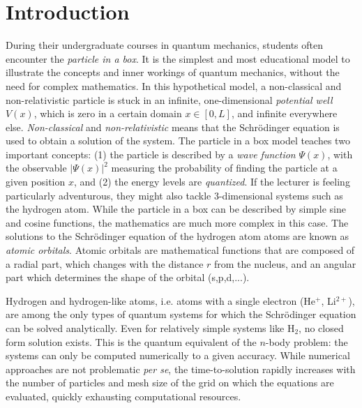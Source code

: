 \chapter*{Introduction}

During their undergraduate courses in quantum mechanics, students often encounter the \emph{particle in a box}. It is the simplest and most educational model to illustrate the concepts and inner workings of quantum mechanics, without the need for complex mathematics. In this hypothetical model, a non-classical and non-relativistic particle is stuck in an infinite, one-dimensional \emph{potential well} $V(x)$, which is zero in a certain domain $x \in [0,L]$, and infinite everywhere else. \emph{Non-classical} and \emph{non-relativistic} means that the Schrödinger equation is used to obtain a solution of the system. The particle in a box model teaches two important concepts: (1) the particle is described by a \emph{wave function}  $\Psi(x)$, with the observable $\left\lvert \Psi (x) \right\rvert^2$ measuring the probability of finding the particle at a given position $x$, and (2) the energy levels are \emph{quantized}. If the lecturer is feeling particularly adventurous, they might also tackle 3-dimensional systems such as the hydrogen atom. While the particle in a box can be described by simple sine and cosine functions, the mathematics are much more complex in this case. The solutions to the Schrödinger equation of the hydrogen atom atoms are known as \emph{atomic orbitals}. Atomic orbitals are mathematical functions that are composed of a radial part, which changes with the distance $r$ from the nucleus, and an angular part which determines the shape of the orbital (s,p,d,...). 

Hydrogen and hydrogen-like atoms, i.e. atoms with a single electron (He$^+$, Li$^{2+}$), are among the only types of quantum systems for which the Schrödinger equation can be solved analytically. Even for relatively simple systems like H$_2$, no closed form solution exists. This is the quantum equivalent of the $n$-body problem: the systems can only be computed numerically to a given accuracy. While numerical approaches are not problematic \emph{per se}, the time-to-solution rapidly increases with the number of particles and mesh size of the grid on which the equations are evaluated, quickly exhausting computational resources.    

